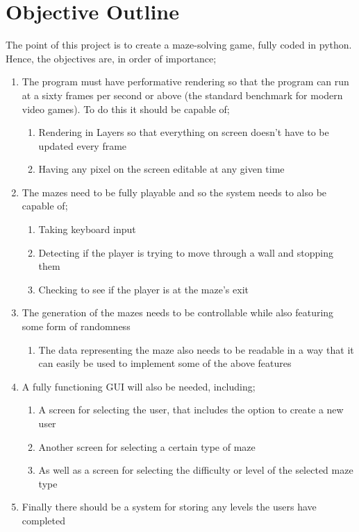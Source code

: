 \documentclass{article}
\begin{document}
\section{Objective Outline}
The point of this project is to create a maze-solving game, fully coded in python. Hence, the objectives are, in order of importance; 
\begin{enumerate}
	\item The program must have performative rendering so that the program can run at a sixty frames per second or above (the standard benchmark for modern video games). To do this it should be capable of;
	\begin{enumerate}
		\item Rendering in Layers so that everything on screen doesn't have to be updated every frame
		\item Having any pixel on the screen editable at any given time
	\end{enumerate}
	\item The mazes need to be fully playable and so the system needs to also be capable of;
	\begin{enumerate}
		\item Taking keyboard input 
		\item Detecting if the player is trying to move through a wall and stopping them
		\item Checking to see if the player is at the maze's exit
	\end{enumerate}
	\item The generation of the mazes needs to be controllable while also featuring some form of randomness
	\begin{enumerate}
		\item The data representing the maze also needs to be readable in a way that it can easily be used to implement some of the above features
	\end{enumerate}
	\item A fully functioning GUI will also be needed, including;
	\begin{enumerate}
		\item A screen for selecting the user, that includes the option to create a new user
		\item Another screen for selecting a certain type of maze
		\item As well as a screen for selecting the difficulty or level of the selected maze type
	\end{enumerate}
	\item Finally there should be a system for storing any levels the users have completed
\end{enumerate}
\end{document}
